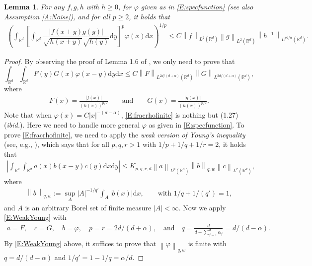 \documentclass[a4paper,11pt]{article}
\numberwithin{equation}{section}
\numberwithin{equation}{section}
\theoremstyle{plain}
\newtheorem{lemma}[theorem]{Lemma}
\theoremstyle{definition}
\newcommand{\ud}{\ensuremath{\mathrm{d} }}
\newcommand{\Norm}[1]{\left\|  #1   \right\|}
\newcommand{\R}{\mathbb{R}}
\begin{document}
\begin{lemma} \label{L:rhofinite}
  For any $f,g,h$ with $h\ge0$, for $\varphi$ given as in \eqref{E:specfunction} (see also Assumption
  \ref{A:Noise}), and for all $p\ge 2$, it holds that
  \begin{align*}
    \left( \int_{\R^d} \left[ \int_{\R^d} \dfrac{|f(x+y)g(y)|}{\sqrt{h(x+y)}\sqrt{h(y)}} \ud y \right]^p \varphi(x) \ud x \right)^{1/p}
    \le C \Norm{f}_{L^2(\R^d)} \Norm{g}_{L^2(\R^d)} \Norm{h^{-1}}_{L^{pd/\alpha}(\R^d)}.
  \end{align*}
\end{lemma}
\begin{proof}
  By observing the proof of Lemma 1.6 of \cite{BCR09}, we only need to prove that
  \begin{equation} \label{E:fracrhofinite}
    \int_{\R^d}\int_{\R^d} F(y)G(x)\varphi\left(x-y\right) \ud y \ud x
    \le C \Norm{F}_{L^{2d/(d+\alpha)}(\R^d)} \Norm{G}_{L^{2d/(d+\alpha)}(\R^d)},
  \end{equation}
  where
  \begin{align*}
    F(x) = \frac{|f(x)|}{(h(x))^{p/2}} \qquad \text{and} \qquad
    G(x) = \frac{|g(x)|}{(h(x))^{p/2}}.
  \end{align*}
  Note that when $\varphi(x)=C |x|^{-(d-\alpha)}$, \eqref{E:fracrhofinite} is nothing but (1.27)
  ({\it ibid.}). Here we need to handle more general $\varphi$ as given in \eqref{E:specfunction}.
  To prove \eqref{E:fracrhofinite}, we need to apply the {\it weak version of Young's inequality}
  (see, e.g., \cite[eq. (7) on p. 107]{LiebLoss01}), which says that for all  $p,q,r >1$ with $1/p +
  1/q + 1/r =2$, it holds that
  \begin{align} \label{E:WeakYoung}
    \left|  \int_{\R^d}\int_{\R^d}a(x)b(x-y)c(y) \ud x \ud y \right|
    \le K_{p,q,r,d} \Norm{a}_{L^p(\R^d)}\Norm{b}_{q,w}\Norm{c}_{L^r(\R^d)},
  \end{align}
  where
  \begin{align*}
    \Norm{b}_{q,w} := \sup_{A} |A|^{-1/q'} \int_A |b(x)| \ud x, \qquad
    \text{with $1/q + 1/(q')=1$},
  \end{align*}
  and $A$ is an arbitrary Borel set of finite measure $|A|<\infty$.
  Now we apply \eqref{E:WeakYoung} with
  \begin{align*}
    a = F, \quad
    c = G, \quad
    b = \varphi, \quad
    p = r=2d/(d+\alpha), \quad \text{and} \quad
    q = \frac{d}{d-\sum_{j=1}^d\alpha_j }
      = d/(d-\alpha).
  \end{align*}
  By \eqref{E:WeakYoung} above, it suffices to prove that $\Norm{\varphi}_{q,w}$ is
  finite with $q = d/(d-\alpha)$ and $1/q' = 1 - 1/q = \alpha/d$.  \bigskip


\end{proof}
\end{document}
